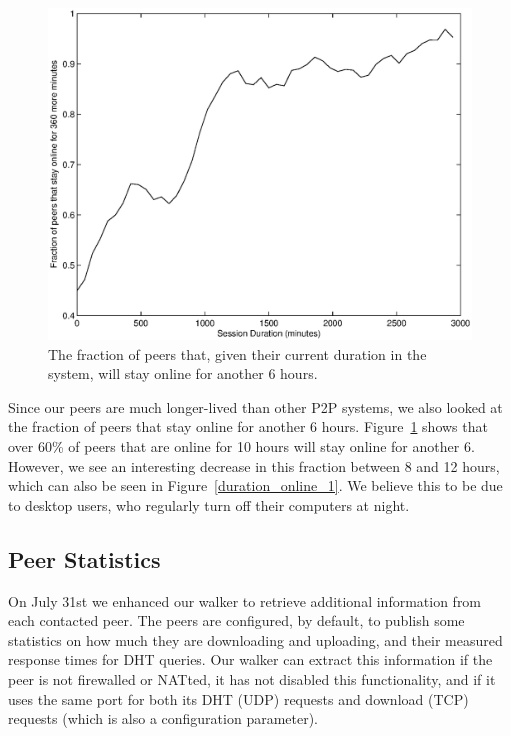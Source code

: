\documentclass[conference]{IEEEtran}
\begin{document}
\begin{figure}
\centering
\includegraphics[width=\columnwidth]{AptP2PDuration-online_6.eps}
\caption{The fraction of peers that, given their current duration in
the system, will stay online for another 6 hours.}
\label{duration_online_6}
\end{figure}

Since our peers are much longer-lived than other P2P systems, we
also looked at the fraction of peers that stay online for another 6
hours. Figure~\ref{duration_online_6} shows that over 60\% of peers
that are online for 10 hours will stay online for another 6.
However, we see an interesting decrease in this fraction between 8
and 12 hours, which can also be seen in
Figure~\ref{duration_online_1}. We believe this to be due to desktop
users, who regularly turn off their computers at night.

\subsection{Peer Statistics}
\label{peer_stats}

On July 31st we enhanced our walker to retrieve additional
information from each contacted peer. The peers are configured, by
default, to publish some statistics on how much they are downloading
and uploading, and their measured response times for DHT queries.
Our walker can extract this information if the peer is not
firewalled or NATted, it has not disabled this functionality, and if
it uses the same port for both its DHT (UDP) requests and download
(TCP) requests (which is also a configuration parameter).
\end{document}
